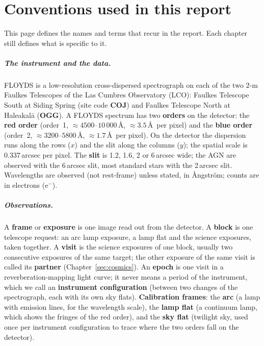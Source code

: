 \chapter*{Conventions used in this report}
{}
\label{sec:conventions}

This page defines the names and terms that recur in the report. Each chapter still defines what is specific to it.

\paragraph{The instrument and the data.} FLOYDS is a low-resolution cross-dispersed spectrograph on each of the two
2-m Faulkes Telescopes of the Las Cumbres Observatory (LCO): Faulkes Telescope South at Siding Spring (site code
\textbf{COJ}) and Faulkes Telescope North at Haleakal\=a (\textbf{OGG}). A FLOYDS spectrum has two \textbf{orders} on
the detector: the \textbf{red order} (order~1, $\approx4500$--$10\,000$\,\AA, $\approx3.5$\,\AA\ per pixel) and the
\textbf{blue order} (order~2, $\approx3200$--$5800$\,\AA, $\approx1.7$\,\AA\ per pixel). On the detector the
dispersion runs along the rows ($x$) and the slit along the columns ($y$); the spatial scale is 0.337\,arcsec per pixel.
The \textbf{slit} is 1.2, 1.6, 2 or 6\,arcsec wide; the AGN are observed with the 6\,arcsec slit, most standard stars
with the 2\,arcsec slit. Wavelengths are observed (not rest-frame) unless stated, in \AA ngstr\"om; counts are in
electrons (e$^-$).

\paragraph{Observations.} A \textbf{frame} or \textbf{exposure} is one image read out from the detector. A
\textbf{block} is one telescope request: an arc lamp exposure, a lamp flat and the science exposures, taken together.
A \textbf{visit} is the science exposures of one block, usually two consecutive exposures of the same target; the other
exposure of the same visit is called its \textbf{partner} (Chapter~\ref{sec:cosmics}). An \textbf{epoch} is one visit
in a reverberation-mapping light curve; it never means a period of the instrument, which we call an
\textbf{instrument configuration} (between two changes of the spectrograph, each with its own sky flats). \textbf{Calibration frames}: the \textbf{arc} (a lamp with emission lines, for
the wavelength scale), the \textbf{lamp flat} (a continuum lamp, which shows the fringes of the red order), and the
\textbf{sky flat} (twilight sky, used once per instrument configuration to trace where the two orders fall on the
detector).

